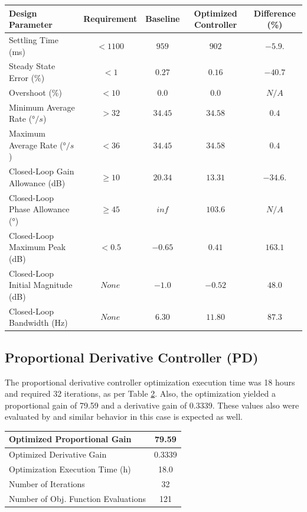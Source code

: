 \begin{table}[H]
	\label{table:5_1_2_PI_PerfTable}
	\centering
	\resizebox{14cm}{!} {
		\begin{tabular}{|l|c|c|c|c|}
			\hline
			Design Parameter & Requirement & Baseline & Optimized Controller & Difference (\%) \\ \hline
			Settling Time (ms) & $< 1100 $ & $959$ & $902$ & $-5.9.$ \\ \hline
			Steady State Error ($\%$) & $< 1$ & $0.27$ & $0.16$ & $-40.7$ \\ \hline
			Overshoot ($\%$) & $< 10 $  & $0.0$ & $0.0$ & $N/A$ \\ \hline
			Minimum Average Rate ($°/s$) & $> 32$ & $34.45$ & $34.58$ & $0.4$ \\ \hline
			Maximum Average Rate ($°/s$) & $< 36$ & $34.45$ & $34.58$ & $0.4$ \\ \hline
			Closed-Loop Gain Allowance (dB) & $ \geq 10 $ & $20.34$ & $13.31$ & $-34.6.$ \\ \hline
			Closed-Loop Phase Allowance ($°$) & $ \geq 45$ & $inf$ & $103.6$ & $N/A$ \\ \hline
			Closed-Loop Maximum Peak (dB) & $ < 0.5$ & $-0.65$ & $0.41$ & $163.1$ \\ \hline
			Closed-Loop Initial Magnitude (dB) & $None$ & $-1.0$ & $-0.52$ & $48.0$ \\ \hline
			Closed-Loop Bandwidth (Hz) & $None$ & $6.30$ & $11.80$ & $87.3$ \\ \hline
	\end{tabular}}
\end{table}

\subsection{Proportional Derivative Controller (PD)}

The proportional derivative controller optimization execution time was 18 hours and required 32 iterations, as per Table \ref{table:5_1_3_PDContExecution}. Also, the optimization yielded a proportional gain of 79.59 and a derivative gain of 0.3339. These values also were evaluated by  and similar behavior in this case is expected as well. 

\begin{table}[H]
	\label{table:5_1_3_PDContExecution}
	\centering
	\resizebox{7cm}{!} {
		\begin{tabular}{|l|c|}
			\hline
			Optimized Proportional Gain & 79.59 \\ \hline
			Optimized Derivative Gain & 0.3339 \\ \hline
			Optimization Execution Time (h) & 18.0 \\ \hline
			Number of Iterations & 32 \\ \hline		
			Number of Obj. Function Evaluations & 121 \\ \hline		
	\end{tabular}}
\end{table}

